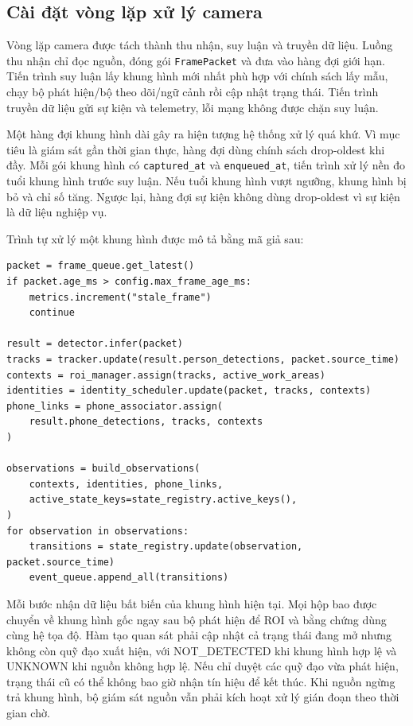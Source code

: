 \subsection{Cài đặt vòng lặp xử lý camera}
Vòng lặp camera được tách thành thu nhận, suy luận và truyền dữ liệu. Luồng thu nhận chỉ đọc nguồn, đóng gói \texttt{FramePacket} và đưa vào hàng đợi giới hạn. Tiến trình suy luận lấy khung hình mới nhất phù hợp với chính sách lấy mẫu, chạy bộ phát hiện/bộ theo dõi/ngữ cảnh rồi cập nhật trạng thái. Tiến trình truyền dữ liệu gửi sự kiện và telemetry, lỗi mạng không được chặn suy luận.

Một hàng đợi khung hình dài gây ra hiện tượng hệ thống xử lý quá khứ. Vì mục tiêu là giám sát gần thời gian thực, hàng đợi dùng chính sách drop-oldest khi đầy. Mỗi gói khung hình có \texttt{captured\_at} và \texttt{enqueued\_at}, tiến trình xử lý nền đo tuổi khung hình trước suy luận. Nếu tuổi khung hình vượt ngưỡng, khung hình bị bỏ và chỉ số tăng. Ngược lại, hàng đợi sự kiện không dùng drop-oldest vì sự kiện là dữ liệu nghiệp vụ.

Trình tự xử lý một khung hình được mô tả bằng mã giả sau:
\begin{Verbatim}[fontsize=\small,breaklines=true]
packet = frame_queue.get_latest()
if packet.age_ms > config.max_frame_age_ms:
    metrics.increment("stale_frame")
    continue

result = detector.infer(packet)
tracks = tracker.update(result.person_detections, packet.source_time)
contexts = roi_manager.assign(tracks, active_work_areas)
identities = identity_scheduler.update(packet, tracks, contexts)
phone_links = phone_associator.assign(
    result.phone_detections, tracks, contexts
)

observations = build_observations(
    contexts, identities, phone_links,
    active_state_keys=state_registry.active_keys(),
)
for observation in observations:
    transitions = state_registry.update(observation, packet.source_time)
    event_queue.append_all(transitions)
\end{Verbatim}

Mỗi bước nhận dữ liệu bất biến của khung hình hiện tại. Mọi hộp bao được chuyển về khung hình gốc ngay sau bộ phát hiện để ROI và bằng chứng dùng cùng hệ tọa độ. Hàm tạo quan sát phải cập nhật cả trạng thái đang mở nhưng không còn quỹ đạo xuất hiện, với NOT\_DETECTED khi khung hình hợp lệ và UNKNOWN khi nguồn không hợp lệ. Nếu chỉ duyệt các quỹ đạo vừa phát hiện, trạng thái cũ có thể không bao giờ nhận tín hiệu để kết thúc. Khi nguồn ngừng trả khung hình, bộ giám sát nguồn vẫn phải kích hoạt xử lý gián đoạn theo thời gian chờ.

